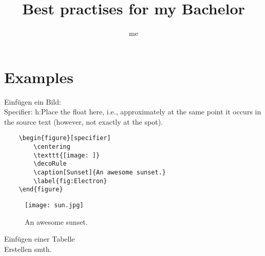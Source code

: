 \documentclass[apaper, 12pt]{article}
\title{Best practises for my Bachelor}
\author{me \faMoonO}
\begin{document}
\maketitle
\setlength{\parindent}{0em}
\setlength{\parskip}{0.5em}
\renewcommand{\baselinestretch}{1}

\section{Examples}

\faChevronCircleRight\hspace{0.5cm} Einfügen ein Bild:\\
Specifier: h:Place the float here, i.e., approximately at the same point it occurs in the source text (however, not exactly at the spot).
\begin{verbatim}
	\begin{figure}[specifier]
		\centering
		\texttt{[image: ]}
		\decoRule
		\caption[Sunset]{An awesome sunset.}
		\label{fig:Electron}
	\end{figure}
\end{verbatim}
\begin{figure}[h]
	\texttt{[image: sun.jpg]}
	\centering
	\label{fig: sun}

	\caption[Sunset]{An awesome sunset.}
\end{figure}

\faChevronCircleRight\hspace{0.5cm} Einfügen einer Tabelle\\

\faChevronCircleRight
\hspace{0.5cm}
Erstellen smth.
\end{document}
